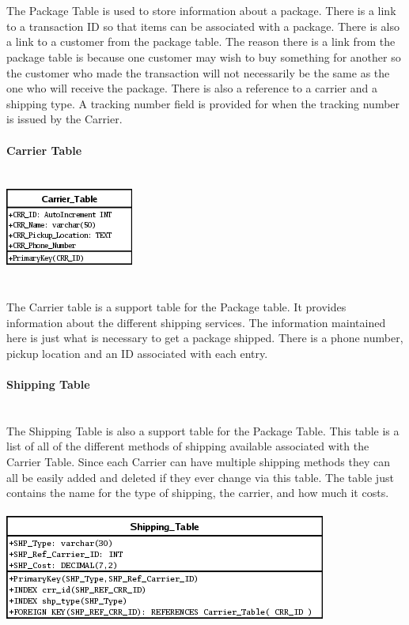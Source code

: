 \documentclass{report}
\begin{document}
	\\
	\\
	The Package Table is used to store information about a package. There is a link to a transaction ID
	so that items can be associated with a package. There is also a link to a customer from the package
	table. The reason there is a link from the package table is because one customer may wish to buy
	something for another so the customer who made the transaction will not necessarily be the same as
	the one who will receive the package. There is also a reference to a carrier and a shipping type.
	A tracking number field is provided for when the tracking number is issued by the Carrier.
	\\
	\\
	{\bf Carrier Table}\\
	\\
	\\
	\includegraphics{Tables/CarrierTable.png}\\
	\\
	\\
	The Carrier table is a support table for the Package table. It provides information about the different
	shipping services. The information maintained here is just what is necessary to get a package shipped.
	There is a phone number, pickup location and an ID associated with each entry.
	\\
	\\
	{\bf Shipping Table}\\
	\\
	\\
	The Shipping Table is also a support table for the Package Table. This table is a list of all of the
	different methods of shipping available associated with the Carrier Table. Since each Carrier can
	have multiple shipping methods they can all be easily added and deleted if they ever change via
	this table. The table just contains the name for the type of shipping, the carrier, and how much
	it costs.\\
	\\
	\includegraphics{Tables/ShippingTable.png}\\
	\\
\end{document}
